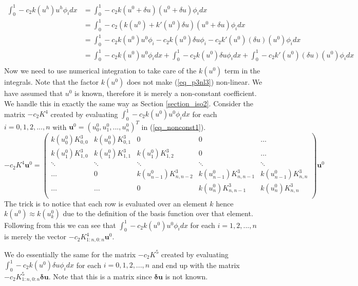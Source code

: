 \documentclass[11pt,fleqn]{article}
\theoremstyle{defstyle}
\begin{document}
\begin{equation}
\begin{aligned}
\int_0^1  -c_2k(u^h)u^h\phi_idx &= \int_0^1  -c_2k(u^0 + \delta u)(u^0 + \delta u)\phi_idx \\
& = \int_0^1  -c_2\left(k(u^0) + k\prime(u^0)\delta u\right)(u^0 + \delta u)\phi_idx \\
&= \int_0^1  -c_2k(u^0)u^0\phi_i -c_2k(u^0)\delta u\phi_i -c_2 k\prime(u^0)(\delta u )(u^0) \phi_i dx \\
&= \int_0^1  -c_2k(u^0)u^0\phi_i dx + \int_0^1 -c_2k(u^0)\delta u\phi_idx + \int_0^1 -c_2 k\prime(u^0)(\delta u )(u^0) \phi_i dx \\
\end{aligned}
\label{eq_p3nl3}
\end{equation}
Now we need to use numerical integration to take care of the $k(u^0)$ term in the integrals. Note that the factor $k(u^0)$ does not make (\ref{eq_p3nl3}) non-linear. We have assumed that $u^0$ is known, therefore it is merely a non-constant coefficient. We handle this in exactly the same way as Section \ref{section_iso2}. Consider the matrix $-c_2K^4$ created by  evaluating $\int_0^1  -c_2k(u^0)u^0\phi_i dx$ for each $i=0,1,2,...,n$  with $\mathbf{u}^0 = \left(u^0_0,u^0_1,...,u^0_n\right)^T$ in (\ref{eq_nonconst1}).
\begin{equation}
-c_2K^4\mathbf{u}^0 = \begin{pmatrix}
k(u^0_0)K^3_{0,0} & k(u^0_0)K^3_{0,1} & 0 & 0 & \hdots  \\
k(u^0_1)K^3_{1,0} & k(u^0_1)K^3_{1,1} & k(u^0_1)K^3_{1,2} &0& \hdots\\
\ddots & \ddots & \ddots & \ddots & \ddots \\  
\hdots & 0 & k(u^0_{n-1})K^3_{n,n-2} & k(u^0_{n-1})K^3_{n,n-1} & k(u^0_{n-1})K^3_{n,n}\\
\hdots & \hdots & 0 & k(u^0_{n})K^3_{n,n-1} & k(u^0_{n})K^3_{n,n}\\
\end{pmatrix}\mathbf{u}^0
\label{eq_nonconst1}
\end{equation}
The trick is to notice that each row is evaluated over an element $k$ hence $k(u^0) \approx k(u^0_k)$ due to the definition of the basis function over that element. Following from this we can see that $\int_0^1  -c_2k(u^0)u^0\phi_i dx$ for each $i=1,2,...,n$ is merely the vector $-c_2K^4_{1:n,0:n}\mathbf{u}^0$. 

We do essentially the same for the matrix $-c_2K^5$ created by  evaluating $\int_0^1  -c_2k(u^0)\delta u\phi_i dx$ for each $i=0,1,2,...,n$ and end up with the matrix $-c_2K^5_{1:n,0:n}\mathbf{\delta u}$. Note that this is a matrix since $\mathbf{\delta u}$ is not known. 
\end{document}
